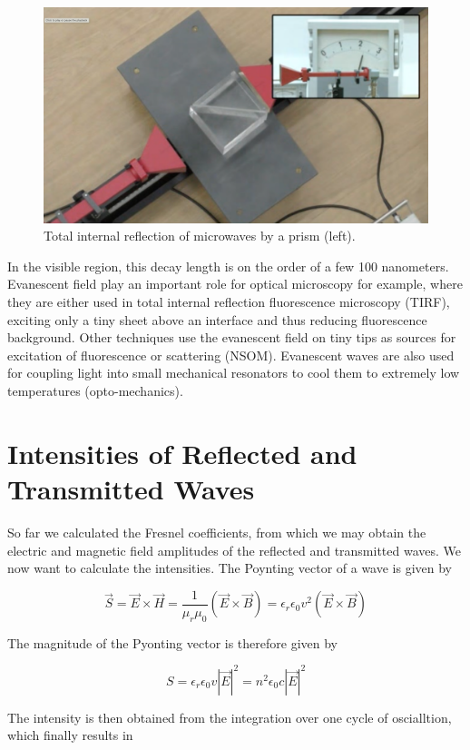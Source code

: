\documentclass[
  a4paper,
]{book}
\begin{document}
\begin{figure}[H]

{\centering \includegraphics[width=0.6\linewidth,height=\textheight,keepaspectratio]{electromagnetic-waves/img/tir_exp2.png}

}

\caption{Total internal reflection of microwaves by a prism (left).}

\end{figure}%

In the visible region, this decay length is on the order of a few 100
nanometers. Evanescent field play an important role for optical
microscopy for example, where they are either used in total internal
reflection fluorescence microscopy (TIRF), exciting only a tiny sheet
above an interface and thus reducing fluorescence background. Other
techniques use the evanescent field on tiny tips as sources for
excitation of fluorescence or scattering (NSOM). Evanescent waves are
also used for coupling light into small mechanical resonators to cool
them to extremely low temperatures (opto-mechanics).

\section{Intensities of Reflected and Transmitted
Waves}\label{intensities-of-reflected-and-transmitted-waves}

So far we calculated the Fresnel coefficients, from which we may obtain
the electric and magnetic field amplitudes of the reflected and
transmitted waves. We now want to calculate the intensities. The
Poynting vector of a wave is given by

\[
\vec{S}=\vec{E}\times \vec{H}=\frac{1}{\mu_r \mu_0}(\vec{E}\times \vec{B})=\epsilon_r \epsilon_0 v^2(\vec{E}\times \vec{B})
\]

The magnitude of the Pyonting vector is therefore given by

\[
S=\epsilon_r\epsilon_0 v|\vec{E}|^2=n^2\epsilon_0 c|\vec{E}|^2
\]

The intensity is then obtained from the integration over one cycle of
oscialltion, which finally results in
\end{document}
